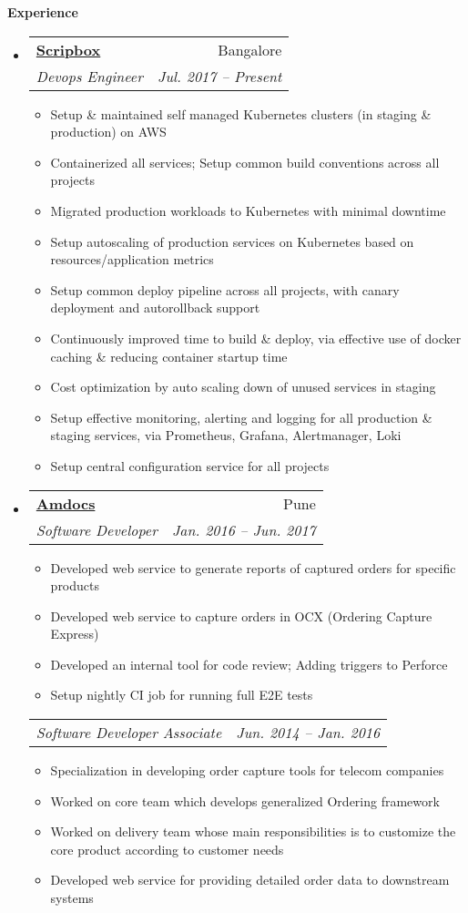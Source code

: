 \documentclass[letterpaper,11pt]{article}
\makeatletter
\newcommand{\resitem}[1]{\item #1 \vspace{-2pt}}
\newcommand{\resheading}[1]{{\large \colorbox{mygrey}{\begin{minipage}{\textwidth}{\textbf{#1 \vphantom{p\^{E}}}}\end{minipage}}}}
\newcommand{\ressubheading}[4]{
\begin{tabular*}{6.5in}{l@{\extracolsep{\fill}}r}
		\textbf{#1} & #2 \\
		\textit{#3} & \textit{#4} \\
\end{tabular*}\vspace{-6pt}}
\newcommand{\ressubsubheading}[2]{
\begin{tabular*}{6.5in}{l@{\extracolsep{\fill}}r}
		\textit{#1} & \textit{#2} \\
\end{tabular*}\vspace{-6pt}}
\makeatother
\begin{document}
\resheading{Experience}
	\begin{itemize}
		\item 
			\ressubheading{\href{https://scripbox.com/}{Scripbox}}{Bangalore}
				{Devops Engineer}{Jul. 2017 -- Present}
				{ \footnotesize
				\begin{itemize}
					\resitem{Setup \& maintained self managed Kubernetes clusters (in staging \& production) on AWS}
					\resitem{Containerized all services; Setup common build conventions across all projects}
					\resitem{Migrated production workloads to Kubernetes with minimal downtime}
          \resitem{Setup autoscaling of production services on Kubernetes based on resources/application metrics}
          \resitem{Setup common deploy pipeline across all projects, with canary deployment and autorollback support}
          \resitem{Continuously improved time to build \& deploy, via effective use of docker caching \& reducing container startup time}
          \resitem{Cost optimization by auto scaling down of unused services in staging}
          \resitem{Setup effective monitoring, alerting and logging for all production \& staging services, via Prometheus, Grafana, Alertmanager, Loki}
          \resitem{Setup central configuration service for all projects}
				\end{itemize}
				}
\begin{comment}
      \ressubsubheading{Product Engineer}{Aug. 2019 -- Present}
        { \footnotesize
        \begin{itemize}
          \resitem{Maintiaining Sanchaar}
          \resitem{blah}
          \resitem{blah}
        \end{itemize}
        }
\end{comment}


		\item 
			\ressubheading{\href{https://www.amdocs.com/}{Amdocs}}{Pune}{Software Developer}{Jan. 2016 -- Jun. 2017}
				{ \footnotesize
				\begin{itemize}
					\resitem{Developed web service to generate reports of captured orders for specific products}
					\resitem{Developed web service to capture orders in OCX (Ordering Capture Express)}
					\resitem{Developed an internal tool for code review; Adding triggers to Perforce}
					\resitem{Setup nightly CI job for running full E2E tests}
				\end{itemize}
				}
      \ressubsubheading{Software Developer Associate}{Jun. 2014 -- Jan. 2016}
        { \footnotesize
        \begin{itemize}
          \resitem{Specialization in developing order capture tools for telecom companies}
          \resitem{Worked on core team which develops generalized Ordering framework}
          \resitem{Worked on delivery team whose main responsibilities is to customize the core product according to customer needs}
          \resitem{Developed web service for providing detailed order data to downstream systems}
        \end{itemize}
        }
	\end{itemize}  %
\end{document}
